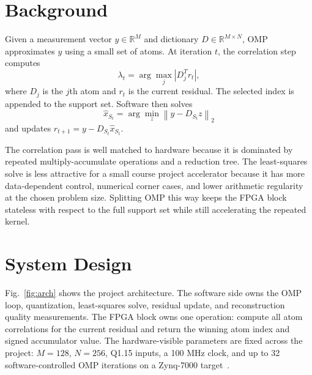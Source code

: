 \documentclass[onecolumn,conference]{IEEEtran}
\begin{document}
\section{Background}
Given a measurement vector $y \in \mathbb{R}^{M}$ and dictionary $D \in \mathbb{R}^{M \times N}$, OMP approximates $y$ using a small set of atoms. At iteration $t$, the correlation step computes
\begin{equation}
    \lambda_t = \arg\max_j \left|D_j^T r_t\right|,
\end{equation}
where $D_j$ is the $j$th atom and $r_t$ is the current residual. The selected index is appended to the support set. Software then solves
\begin{equation}
    \hat{x}_{S_t} = \arg\min_z \left\|y - D_{S_t}z\right\|_2
\end{equation}
and updates $r_{t+1}=y-D_{S_t}\hat{x}_{S_t}$.

The correlation pass is well matched to hardware because it is dominated by repeated multiply-accumulate operations and a reduction tree. The least-squares solve is less attractive for a small course project accelerator because it has more data-dependent control, numerical corner cases, and lower arithmetic regularity at the chosen problem size. Splitting OMP this way keeps the FPGA block stateless with respect to the full support set while still accelerating the repeated kernel.

\section{System Design}
Fig.~\ref{fig:arch} shows the project architecture. The software side owns the OMP loop, quantization, least-squares solve, residual update, and reconstruction quality measurements. The FPGA block owns one operation: compute all atom correlations for the current residual and return the winning atom index and signed accumulator value. The hardware-visible parameters are fixed across the project: $M=128$, $N=256$, Q1.15 inputs, a 100 MHz clock, and up to 32 software-controlled OMP iterations on a Zynq-7000 target~\cite{xilinx}.
\end{document}
